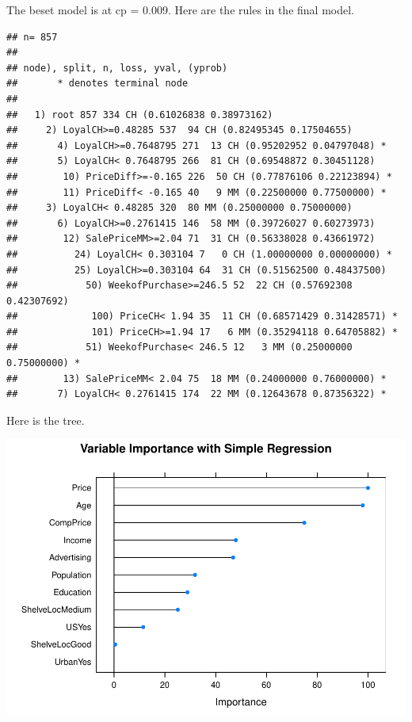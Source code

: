 \documentclass[
]{book}
\newenvironment{Shaded}{\begin{snugshade}}{\end{snugshade}}
\newcommand{\DecValTok}[1]{\textcolor[rgb]{0.00,0.00,0.81}{#1}}
\newcommand{\KeywordTok}[1]{\textcolor[rgb]{0.13,0.29,0.53}{\textbf{#1}}}
\newcommand{\NormalTok}[1]{#1}
\newcommand{\OperatorTok}[1]{\textcolor[rgb]{0.81,0.36,0.00}{\textbf{#1}}}
\begin{document}
The beset model is at cp = 0.009. Here are the rules in the final model.

\begin{Shaded}
\end{Shaded}

\begin{verbatim}
## n= 857 
## 
## node), split, n, loss, yval, (yprob)
##       * denotes terminal node
## 
##   1) root 857 334 CH (0.61026838 0.38973162)  
##     2) LoyalCH>=0.48285 537  94 CH (0.82495345 0.17504655)  
##       4) LoyalCH>=0.7648795 271  13 CH (0.95202952 0.04797048) *
##       5) LoyalCH< 0.7648795 266  81 CH (0.69548872 0.30451128)  
##        10) PriceDiff>=-0.165 226  50 CH (0.77876106 0.22123894) *
##        11) PriceDiff< -0.165 40   9 MM (0.22500000 0.77500000) *
##     3) LoyalCH< 0.48285 320  80 MM (0.25000000 0.75000000)  
##       6) LoyalCH>=0.2761415 146  58 MM (0.39726027 0.60273973)  
##        12) SalePriceMM>=2.04 71  31 CH (0.56338028 0.43661972)  
##          24) LoyalCH< 0.303104 7   0 CH (1.00000000 0.00000000) *
##          25) LoyalCH>=0.303104 64  31 CH (0.51562500 0.48437500)  
##            50) WeekofPurchase>=246.5 52  22 CH (0.57692308 0.42307692)  
##             100) PriceCH< 1.94 35  11 CH (0.68571429 0.31428571) *
##             101) PriceCH>=1.94 17   6 MM (0.35294118 0.64705882) *
##            51) WeekofPurchase< 246.5 12   3 MM (0.25000000 0.75000000) *
##        13) SalePriceMM< 2.04 75  18 MM (0.24000000 0.76000000) *
##       7) LoyalCH< 0.2761415 174  22 MM (0.12643678 0.87356322) *
\end{verbatim}

Here is the tree.

\begin{Shaded}
\end{Shaded}

\includegraphics{data-sci_files/figure-latex/unnamed-chunk-76-1.pdf}
\end{document}
